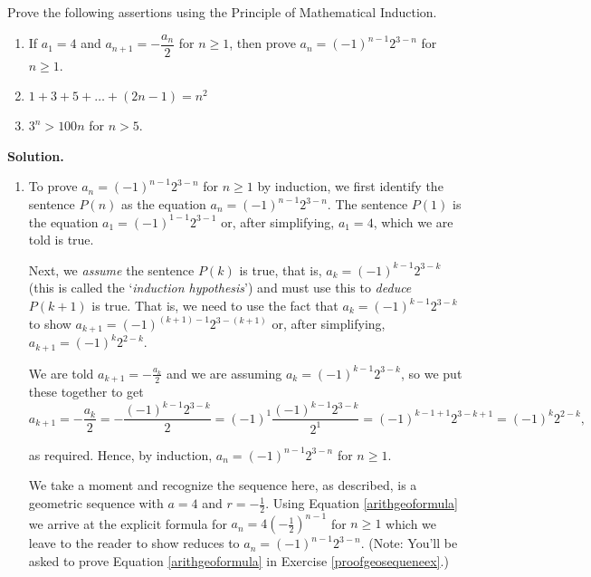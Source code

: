 \documentclass{ximera}
\begin{document}
\begin{example} \label{inductionex01}  Prove the following assertions using the Principle of Mathematical Induction.

\begin{enumerate}


\item If $a_{1} = 4$ and $a_{n+1} = -\dfrac{a_{n}}{2}$ for $n \geq 1$,  then prove $a_{n} = (-1)^{n-1} 2^{3-n}$ for $n \geq 1$.

\item $1 + 3 + 5 + \ldots + (2n-1) = n^2$

\item  $3^{n} > 100n$ for $n > 5$.


\end{enumerate}


{\bf Solution.}

\begin{enumerate}

\item To prove $a_{n} = (-1)^{n-1} 2^{3-n}$ for $n \geq 1$ by induction, we first identify the sentence $P(n)$ as the equation $a_{n} = (-1)^{n-1} 2^{3-n}$.  The sentence $P(1)$ is the equation $a_{1} = (-1)^{1-1}2^{3-1}$ or, after simplifying,  $a_{1} = 4$, which we are told is true.
 
 Next, we \textit{assume} the sentence $P(k)$ is true, that is, $a_{k}= (-1)^{k-1} 2^{3-k}$ (this is called the `\textit{induction hypothesis}') and must use this to \textit{deduce} $P(k+1)$ is true. That is, we need to use the fact that  $a_{k}= (-1)^{k-1} 2^{3-k}$ to show $a_{k+1} = (-1)^{(k+1)-1}2^{3-(k+1)}$ or, after simplifying, $a_{k+1} = (-1)^{k} 2^{2-k}$.
 
 We are told $a_{k+1} =  -\frac{a_{k}}{2}$ and we are assuming $a_{k}= (-1)^{k-1} 2^{3-k}$, so we put these together to get \[ a_{k+1} =  -\frac{a_{k}}{2} =  -\frac{(-1)^{k-1} 2^{3-k}}{2}  = (-1)^{1} \frac{(-1)^{k-1} 2^{3-k}}{2^{1}}=  (-1)^{k-1+1} 2^{3-k+1} = (-1)^{k} 2^{2-k},\]
 
 as required.  Hence, by induction, $a_{n} = (-1)^{n-1} 2^{3-n}$ for $n \geq 1$.

We take a moment and recognize the sequence here, as described, is a geometric sequence with $a = 4$ and $r  = -\frac{1}{2}$.  Using Equation \ref{arithgeoformula} we arrive at the explicit formula for $a_{n} = 4 \left(- \frac{1}{2} \right)^{n-1}$ for $n \geq 1$ which we leave to the reader to show reduces to  $a_{n} = (-1)^{n-1} 2^{3-n}$.    (Note: You'll be asked to prove Equation \ref{arithgeoformula}  in Exercise \ref{proofgeosequeneex}.)


\end{enumerate}
\end{example}
\end{document}
